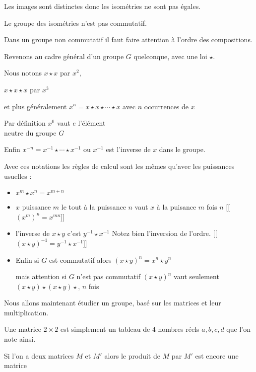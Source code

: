 Les images sont distinctes donc les isométries ne sont pas égales.

Le groupe des isométries n'est pas commutatif.

Dans un groupe non commutatif il faut faire attention 
à l'ordre des compositions.



\diapo

Revenons au cadre général d'un groupe $G$ quelconque, avec une loi $\star$.

Nous notons $x \star x$ par $x^2$,

 $x\star x \star x$ par $x^3$

et plus généralement 
 $x^{n} = x\star x \star \cdots \star x$ avec $n$ occurrences de $x$


Par définition $x^0$ vaut $e$ l'élément\\ neutre du groupe $G$

Enfin $x^{-n} = x^{-1}\star \cdots \star x^{-1}$ ou $x^{-1}$ est l'inverse
de $x$ dans le groupe.


\change

Avec ces notations les règles de calcul sont les mêmes
qu'avec les puissances usuelles :
 
\begin{itemize}
  \item $x^m \star x^n = x^{m+n}$
  \item $x$ puissance $m$ le tout  à la puissance $n$ vaut $x$ à la puisance $m$ fois $n$
[[$(x^m)^n = x^{mn}$]]
  \item l'inverse de $x\star y$ c'est $y^{-1} \star x^{-1}$
Notez bien l'inversion de l'ordre.
[[$(x \star y)^{-1} = y^{-1} \star x^{-1}$]]
  \item Enfin si $G$ est commutatif alors $(x\star y)^n = x^n \star y^n$

mais attention si $G$ n'est pas commutatif $(x\star y)^n$ vaut seulement
$(x\star y) \star (x\star y) \star  $, $n$ fois
\end{itemize} 

\diapo

Nous allons maintenant étudier un groupe, basé sur les matrices et leur multiplication.

Une matrice $2\times 2$ est simplement un tableau de $4$ nombres réels
$a,b,c,d$ que l'on note ainsi.

\change

Si l'on a deux matrices $M$ et $M'$ alors le produit de $M$ par $M'$
est encore une matrice 

